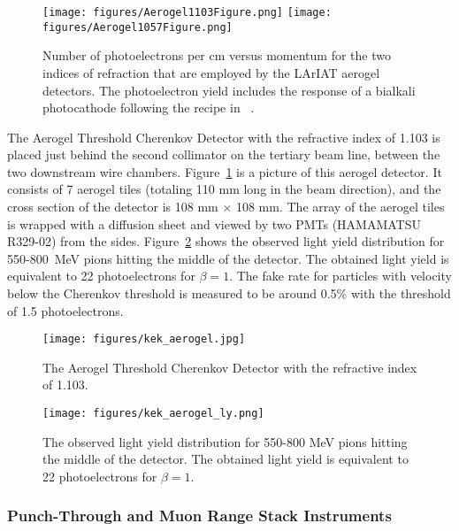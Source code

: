 \begin{figure}[htb]
\centering
\texttt{[image: figures/Aerogel1103Figure.png]}
\hspace{1cm}
\texttt{[image: figures/Aerogel1057Figure.png]}
\caption{Number of photoelectrons per cm versus momentum for the two indices of refraction that are employed by the LArIAT aerogel detectors. The photoelectron yield includes the response of a bialkali photocathode following the recipe in ~\cite{bib8}. }
\end{figure}


The Aerogel Threshold Cherenkov Detector with the refractive index of 1.103 is placed just behind the second collimator on the tertiary beam line, between the two downstream wire chambers.
Figure~\ref{fig:kek_aerogel} is a picture of this aerogel detector.
It consists of 7 aerogel tiles (totaling 110 mm long in the beam direction), and the cross section of the detector is 108 mm $\times$ 108 mm.
The array of the aerogel tiles is wrapped with a diffusion sheet and viewed by two PMTs (HAMAMATSU R329-02) from the sides.
Figure~\ref{fig:kek_aerogel_ly} shows the observed light yield distribution for 550-800~MeV pions hitting the middle of the detector.
The obtained light yield is equivalent to 22 photoelectrons for $\beta=1$.
The fake rate for particles with velocity below the Cherenkov threshold is measured to be around 0.5\% with the threshold of 1.5 photoelectrons.

\begin{figure}[htb]
\centering
\texttt{[image: figures/kek\_aerogel.jpg]}
\caption{The Aerogel Threshold Cherenkov Detector with the refractive index of 1.103.}
\label{fig:kek_aerogel}
\end{figure}

\begin{figure}[h]
\centering
\texttt{[image: figures/kek\_aerogel\_ly.png]}
\caption{The observed light yield distribution for 550-800 MeV pions hitting the middle of the detector.
The obtained light yield is equivalent to 22 photoelectrons for $\beta=1$.}
\label{fig:kek_aerogel_ly}
\end{figure}

\subsubsection{Punch-Through and Muon Range Stack Instruments}\label{sec:MuRS}



